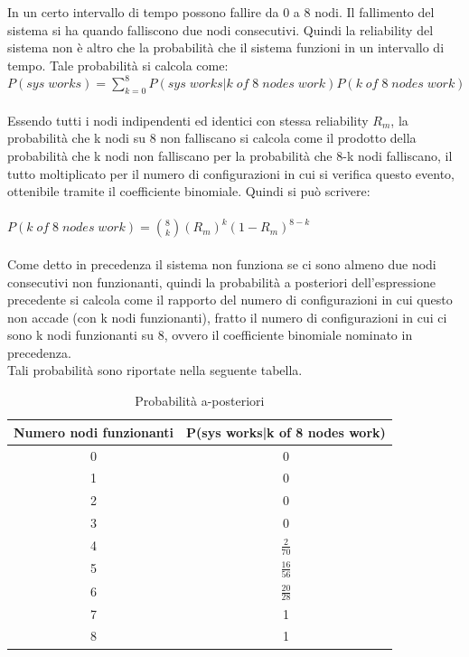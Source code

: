 	In un certo intervallo di tempo possono fallire da 0 a 8 nodi. Il fallimento del sistema si ha quando falliscono due nodi consecutivi. Quindi la reliability del sistema non è altro che la probabilità che il sistema funzioni in un intervallo di tempo. Tale probabilità si calcola come:\\
	 $ P(sys\;works)=\sum_{k=0}^{8}P(sys\;works|k\;of\;8\;nodes\;work)P(k\;of\;8\;nodes\;work) $\\\\
	 Essendo tutti i nodi indipendenti ed identici con stessa reliability $R_{m}$, la probabilità che k nodi su 8 non falliscano si calcola come il prodotto della probabilità che k nodi non falliscano per la probabilità che 8-k nodi falliscano, il tutto moltiplicato per il numero di configurazioni in cui si verifica questo evento, ottenibile tramite il coefficiente binomiale. Quindi si può scrivere:\\\\
	$ P(k\;of\;8\;nodes\;work)=\binom{8}{k}(R_{m})^{k}(1-R_{m})^{8-k} $\\\\
	Come detto in precedenza il sistema non funziona se ci sono almeno due nodi consecutivi non funzionanti, quindi la probabilità a posteriori dell'espressione precedente si calcola come il rapporto del numero di configurazioni in cui questo non accade (con k nodi funzionanti), fratto il numero di configurazioni in cui ci sono k nodi funzionanti su 8, ovvero il coefficiente binomiale nominato in precedenza.\\
	Tali probabilità sono riportate nella seguente tabella.
	
	\begin{table}[H]
		\footnotesize
		\caption{Probabilità a-posteriori}
		\label{tab:rel_tab}
		\centering
		\begin{tabular}{cc}
			\toprule
			\textbf{Numero nodi funzionanti}&\textbf{P(sys works|k of 8 nodes work)}\\
			\midrule
			0 & 0\\
			\midrule
			1 & 0\\
			\midrule
			2 & 0\\
			\midrule
			3 & 0\\
			\midrule
			4 & $\frac{2}{70}$\\
			\midrule
			5 & $ \frac{16}{56} $\\
			\midrule
			6 & $\frac{20}{28} $\\
			\midrule
			7 & 1\\
			\midrule
			8 & 1\\
			\bottomrule
			
		\end{tabular}
	\end{table} 
	 
